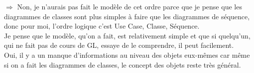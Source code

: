 \documentclass[12pt]{article}
\begin{document}
	 
	$\Rightarrow$ Non, je n’aurais pas fait le modèle de cet ordre parce que je pense que les diagrammes de 
	classes sont plus simples à faire que les diagrammes de séquence, donc pour moi, l’ordre 
	logique c’est Use Case, Classe, Séquence.\\
	Je pense que le modèle, qu’on a fait, est relativement simple et que si quelqu’un, qui ne fait 
	 pas de cours de GL, essaye de le comprendre, il peut facilement.\\
	 Oui, il y a un manque d’informations au niveau des objets eux-mêmes car même si on a fait 
	 les diagrammes de classes, le concept des objets reste très général.
\end{document}

